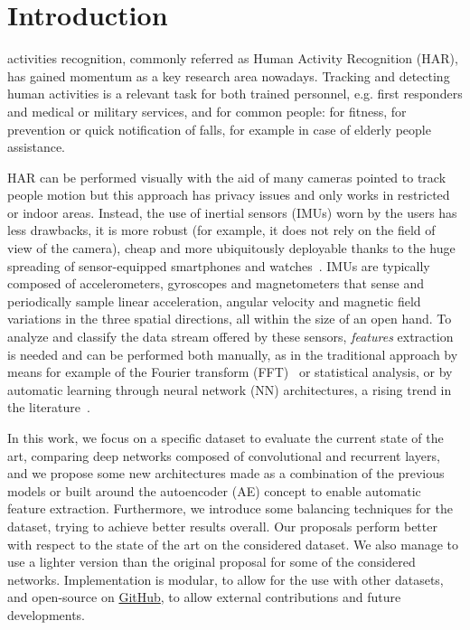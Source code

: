 
\section{Introduction}
\label{sec:introduction}


 activities recognition, commonly referred as Human Activity Recognition (HAR), has gained momentum as a key research area nowadays.
Tracking and detecting human activities is a relevant task for both trained personnel, e.g. first responders and medical or military services, and for common people: for fitness, for prevention or quick notification of falls, for example in case of elderly people assistance.%

HAR can be performed visually with the aid of many cameras pointed to track people motion but this approach has privacy issues and only works in restricted or indoor areas.
Instead, the use of inertial sensors (IMUs) worn by the users has less drawbacks, it is more robust (for example, it does not rely on the field of view of the camera), cheap and more ubiquitously deployable thanks to the huge spreading of sensor-equipped smartphones and watches~\cite{Wang-survey}.
IMUs are typically composed of accelerometers, gyroscopes and magnetometers that sense and periodically sample linear acceleration, angular velocity and magnetic field variations in the three spatial directions, all within the size of an open hand.
To analyze and classify the data stream offered by these sensors, \textit{features} extraction is needed and can be performed both manually, as in the traditional approach by means for example of the Fourier transform (FFT)~\cite{FrankNadales} or statistical analysis, or by automatic learning through neural network (NN) architectures, a rising trend in the literature~\cite{Wang-survey}.

In this work, we focus on a specific dataset to evaluate the current state of the art, comparing deep networks composed of convolutional and recurrent layers, and we propose some new architectures made as a combination of the previous models or built around the autoencoder (AE) concept to enable automatic feature extraction.
Furthermore, we introduce some balancing techniques for the dataset, trying to achieve better results overall.
Our proposals perform better with respect to the state of the art on the considered dataset.
We also manage to use a lighter version than the original proposal for some of the considered networks.
Implementation is modular, to allow for the use with other datasets, and open-source on \href{https://github.com/eliabntt/deep_into_HAR}{GitHub}, to allow external contributions and future developments.

